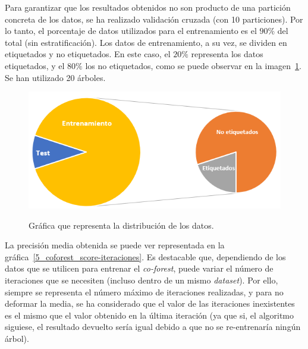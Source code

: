 Para garantizar que los resultados obtenidos no son producto de una partición concreta de los datos, se ha realizado validación cruzada (con 10 particiones). Por lo tanto, el porcentaje de datos utilizados para el entrenamiento es el $90\%$ del total (sin estratificación). Los datos de entrenamiento, a su vez, se dividen en etiquetados y no etiquetados. En este caso, el $20\%$ representa los datos etiquetados, y el $80\%$ los no etiquetados, como se puede observar en la imagen~\ref{5_entrenamiento_particiones}. Se han utilizado 20 árboles.

\begin{figure}[h]
	\caption{Gráfica que representa la distribución de los datos.}
	\centering
	\includegraphics[width=\textwidth]{../img/memoria/5_entrenamiento_particiones}
	\label{5_entrenamiento_particiones}
\end{figure}


 La precisión media obtenida se puede ver representada en la gráfica~\ref{5_coforest_score-iteraciones}. Es destacable que, dependiendo de los datos que se utilicen para entrenar el \textit{co-forest}, puede variar el número de iteraciones que se necesiten (incluso dentro de un mismo \textit{dataset}). Por ello, siempre se representa el número máximo de iteraciones realizadas, y para no deformar la media, se ha considerado que el valor de las iteraciones inexistentes es el mismo que el valor obtenido en la última iteración (ya que si, el algoritmo siguiese, el resultado devuelto sería igual debido a que no se re-entrenaría ningún árbol).

